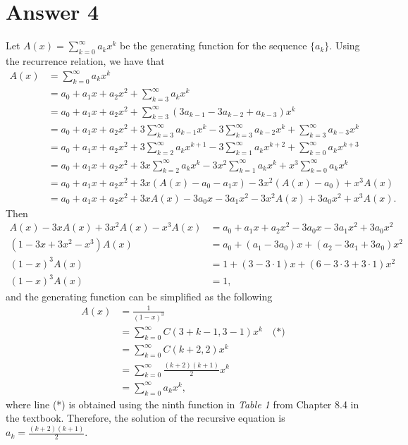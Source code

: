 \documentclass[11pt]{article}
\begin{document}
\section*{Answer 4}
Let $A(x) = \sum_{k = 0}^\infty a_k x^k$ be the generating function for the sequence $\{a_k\}$. Using the recurrence relation, we have that
\begin{align*}
    A(x) &= \sum_{k = 0}^\infty a_k x^k \\
    &= a_0 + a_1 x + a_2 x^2 + \sum_{k = 3}^\infty a_k x^k \\
    &= a_0 + a_1 x + a_2 x^2 + \sum_{k = 3}^\infty (3 a_{k - 1} - 3 a_{k - 2} + a_{k - 3}) x^k \\
    &= a_0 + a_1 x + a_2 x^2 + 3 \sum_{k = 3}^\infty a_{k - 1} x^k - 3 \sum_{k = 3}^\infty a_{k - 2} x^k + \sum_{k = 3}^\infty a_{k - 3} x^k \\
    &= a_0 + a_1 x + a_2 x^2 + 3 \sum_{k = 2}^\infty a_k x^{k + 1} - 3 \sum_{k = 1}^\infty a_k x^{k + 2} + \sum_{k = 0}^\infty a_k x^{k + 3} \\
    &= a_0 + a_1 x + a_2 x^2 + 3x \sum_{k = 2}^\infty a_k x^k - 3x^2 \sum_{k = 1}^\infty a_k x^k + x^3 \sum_{k = 0}^\infty a_k x^k \\
    &= a_0 + a_1 x + a_2 x^2 + 3x (A(x) - a_0 - a_1 x) - 3x^2 (A(x) - a_0) + x^3 A(x) \\
    &= a_0 + a_1 x + a_2 x^2 + 3x A(x) - 3 a_0 x - 3 a_1 x^2 - 3x^2 A(x) + 3 a_0 x^2 + x^3 A(x).
\end{align*}
Then
\begin{align*}
    A(x) - 3x A(x) + 3x^2 A(x) - x^3 A(x) &= a_0 + a_1 x + a_2 x^2 - 3 a_0 x - 3 a_1 x^2 + 3 a_0 x^2 \\
    (1 - 3x + 3x^2 - x^3) A(x) &= a_0 + (a_1 - 3 a_0) x + (a_2 - 3 a_1 + 3 a_0) x^2 \\
    (1 - x)^3 A(x) &= 1 + (3 - 3 \cdot 1) x + (6 - 3 \cdot 3 + 3 \cdot 1) x^2 \\
    (1 - x)^3 A(x) &= 1,
\end{align*}
and the generating function can be simplified as the following
\begin{align*}
    A(x) &= \frac{1}{(1 - x)^3} \\
    &= \sum_{k = 0}^\infty C(3 + k - 1, 3 - 1) x^k \quad \text{(*)} \\
    &= \sum_{k = 0}^\infty C(k + 2, 2) x^k \\
    &= \sum_{k = 0}^\infty \frac{(k + 2)(k + 1)}{2} x^k \\
    &= \sum_{k = 0}^\infty a_k x^k,
\end{align*}
where line (*) is obtained using the ninth function in \textit{Table 1} from Chapter 8.4 in the textbook. Therefore, the solution of the recursive equation is $a_k = \frac{(k + 2)(k + 1)}{2}$.
\end{document}

